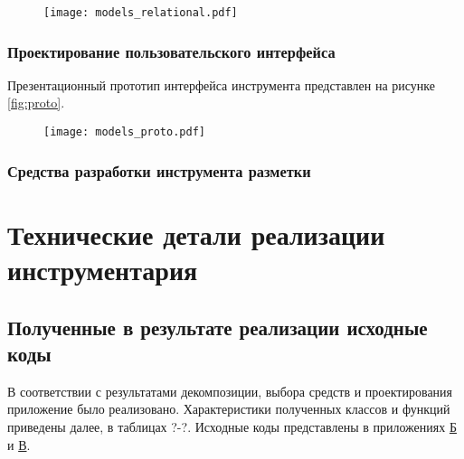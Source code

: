 \documentclass[../main]{subfiles}
\begin{document}
\begin{figure}[H]
    \centering
    {\texttt{[image: models\_relational.pdf]}}
    \vspace{-\baselineskip}
\end{figure}

\subsubsection{Проектирование пользовательского интерфейса}

Презентационный прототип интерфейса инструмента представлен на рисунке \ref{fig:proto}.

\begin{figure}[H]
    \centering
    {\texttt{[image: models\_proto.pdf]}}
    \vspace{-\baselineskip}
\end{figure}

\subsubsection{Средства разработки инструмента разметки}

\newpage
\section{Технические детали реализации инструментария}

\subsection{Полученные в результате реализации исходные коды}
В соответствии с результатами декомпозиции, выбора средств и проектирования приложение было реализовано. Характеристики полученных классов и функций приведены далее, в таблицах ?-?. Исходные коды представлены в приложениях \hyperref[sec:appendix2]{Б} и \hyperref[sec:appendix3]{В}.
\end{document}
